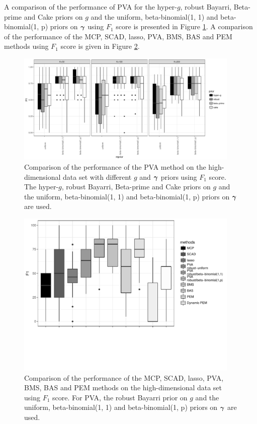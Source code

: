 A comparison of the performance of PVA for the hyper-$g$, robust Bayarri,
Beta-prime and Cake priors on $g$ and the uniform, beta-binomial(1, 1) and
beta-binomial(1, p) priors on ${\boldsymbol \gamma}$ using $F_1$ score is presented in
Figure \ref{fig:highDimPVA_F1}. A comparison of the performance of the MCP,
SCAD, lasso, PVA, BMS, BAS and PEM  methods using $F_1$ score is given in
Figure \ref{fig:highDimPVA_F1_compare}.

\begin{figure}[h!]
	\begin{center}
		\includegraphics[width=0.95\textwidth]{./highDimPVA_F1.pdf}  
	\end{center}
	\caption{Comparison of the performance of the PVA method on the
						high-dimensional data set with different $g$ and ${\boldsymbol \gamma}$ priors using $F_1$ score.
						The hyper-$g$,
						robust Bayarri, Beta-prime and Cake priors on $g$ and the uniform, beta-binomial(1, 1) and beta-binomial(1, p) priors on ${\boldsymbol \gamma}$ are used.}
	\label{fig:highDimPVA_F1}
\end{figure}

\begin{figure}[h!]
	\begin{center}	
		\includegraphics[trim={0 4cm 0 0},width=0.95\textwidth]{./highDimPVA_F1_compare_edit.pdf}  
	\end{center}
	\caption{Comparison of the performance of the MCP, SCAD, lasso, PVA, BMS, BAS and PEM methods on the
						high-dimensional data set using $F_1$ score. For PVA, the
						robust Bayarri prior on $g$ and the uniform, beta-binomial(1, 1) and beta-binomial(1, p) priors
						on ${\boldsymbol \gamma}$ are used.}
	\label{fig:highDimPVA_F1_compare}
\end{figure}

